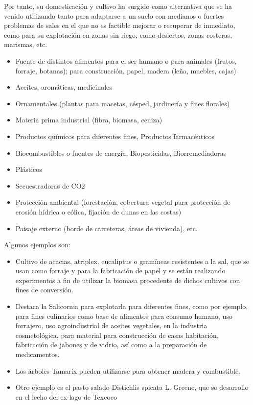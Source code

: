 Por tanto, su domesticación y cultivo ha surgido como alternativa que se ha venido utilizando tanto para adaptarse a un suelo con medianos o fuertes problemas de sales en el que no es factible mejorar o recuperar de inmediato, como para su explotación en zonas sin riego, como desiertos, zonas costeras, marismas, etc.
\begin{itemize}
  \item Fuente de distintos alimentos para el ser humano o para animales (frutos, forraje, botanas); para construcción, papel, madera (leña, muebles, cajas)
  \item Aceites, aromáticas, medicinales
  \item Ornamentales (plantas para macetas, césped, jardinería y fines florales)
  \item Materia prima industrial (fibra, biomasa, ceniza)
  \item Productos químicos para diferentes fines, Productos farmacéuticos
  \item Biocombustibles o fuentes de energía, Biopesticidas, Biorremediadoras
  \item Plásticos
  \item Secuestradoras de CO2
  \item Protección ambiental (forestación, cobertura vegetal para protección de erosión hídrica o eólica, fijación de dunas en las costas)
  \item Paisaje externo (borde de carreteras, áreas de vivienda), etc.
\end{itemize}
Algunos ejemplos son:
\begin{itemize}
  \item Cultivo de acacias, atriplex, eucaliptus o gramíneas resistentes a la sal, que se usan como forraje y para la fabricación de papel y se están realizando experimentos a fin de utilizar la biomasa procedente de dichos cultivos con fines de conversión.
  \item Destaca la Salicornia para explotarla para diferentes fines, como por ejemplo, para fines culinarios como base de alimentos para consumo humano, uso forrajero, uso agroindustrial de aceites vegetales, en la industria cosmetológica, para material para construcción de casas habitación, fabricación de jabones y de vidrio, así como a la preparación de medicamentos.
  \item Los árboles Tamarix pueden utilizarse para obtener madera y combustible.
  \item Otro ejemplo es el pasto salado Distichlis spicata L. Greene, que se desarrollo en el lecho del ex-lago de Texcoco 
\end{itemize}

